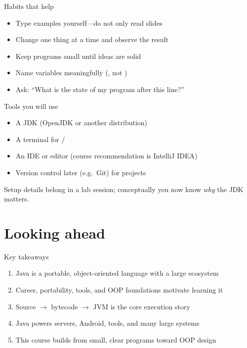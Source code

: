 \documentclass[aspectratio=169,11pt]{beamer}
\begin{document}
    \begin{frame}{Habits that help}
        \begin{itemize}
            \item Type examples yourself---do not only read slides
            \item Change one thing at a time and observe the result
            \item Keep programs small until ideas are solid
            \item Name variables meaningfully (, not )
            \item Ask: ``What is the state of my program after this line?''
        \end{itemize}
    \end{frame}

    \begin{frame}{Tools you will use}
        \begin{itemize}
            \item A JDK (OpenJDK or another distribution)
            \item A terminal for  / 
            \item An IDE or editor (course recommendation is IntelliJ IDEA)
            \item Version control later (e.g.\ Git) for projects
        \end{itemize}
        \vspace{0.5em}
        Setup details belong in a lab session; conceptually you now know \emph{why}
        the JDK matters.
    \end{frame}

    \section{Looking ahead}

    \begin{frame}{Key takeaways}
        \begin{enumerate}
            \item Java is a portable, object-oriented language with a large ecosystem
            \item Career, portability, tools, and OOP foundations motivate learning it
            \item Source $\rightarrow$ bytecode $\rightarrow$ JVM is the core execution story
            \item Java powers servers, Android, tools, and many large systems
            \item This course builds from small, clear programs toward OOP design
        \end{enumerate}
    \end{frame}
\end{document}
